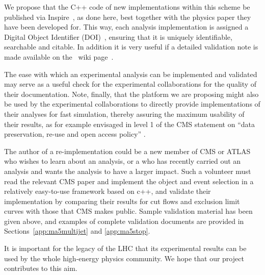 We propose that the C++ code of new implementations within this scheme be published 
via {\sc Inspire}~\cite{inspire}, as done here,  
best together with the physics paper they have been developed for. 
This way, each analysis implementation is assigned a 
Digital Object Identifier (DOI)~\cite{doi}, ensuring that it is uniquely identifiable, searchable and citable. 
In addition it is very useful if a detailed validation note is made available on the  \ma\ wiki page~\cite{ma5wiki}. 

The ease with which an experimental analysis can be implemented and validated may serve as a useful check for the experimental collaborations for the quality of their documentation. Note, finally, that the platform we are pro\-posing might also be used by the experimental collaborations to directly provide implementations of their analyses for fast simulation, thereby assuring the maximum usability of their results, as for example envisaged in level 1 of the CMS statement on ``data preservation, re-use and open access policy'' \cite{CMS:DataPolicy}. 

The author of a re-implementation could be a new member of CMS or ATLAS who wishes to learn about an analysis, or a who has recently carried out an analysis and wants the analysis to have a larger impact. Such a volunteer must read the relevant CMS paper and implement the object and event selection in a relatively easy-to-use framework based on c++, and validate their implementation by comparing their results for cut flows and exclusion limit curves with those that CMS makes public. Sample validation material has been given above, and examples of complete validation documents are provided in Sections~\ref{app:ma5multijet} and \ref{app:ma5stop}.

It is important for the legacy of the LHC that its experimental results can be used by the whole high-energy physics community. We hope that our project contributes to this aim. 

